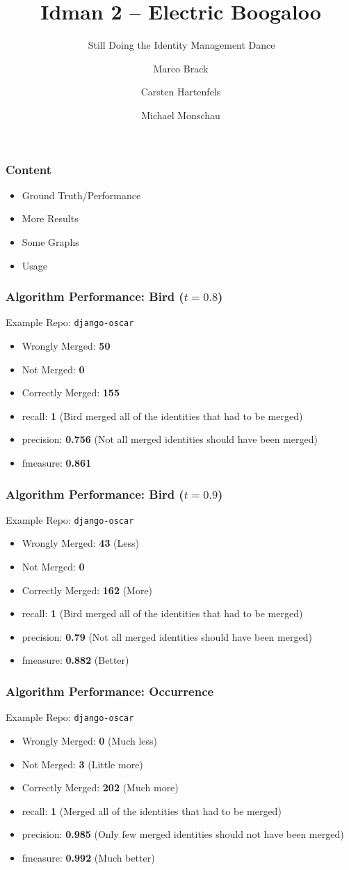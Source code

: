\documentclass[slidestop,usenames,dvipsnames]{beamer}
\title{Idman 2 -- Electric Boogaloo}
\subtitle{💃💃💃\ Still Doing the Identity Management Dance 💃💃💃}
\author{Marco Brack \and Carsten Hartenfels \and Michael Monschau}
\newcommand{\gitem}{\vfill\item}
\begin{document}
\begin{frame}
    \titlepage
\end{frame}




\begin{frame}
    \frametitle{Content}
    \begin{itemize}
      \gitem Ground Truth/Performance
       \gitem More Results
       \gitem Some Graphs
       \gitem Usage
    \end{itemize}
    \vfill
\end{frame}


\begin{frame}
  \frametitle{Algorithm Performance: Bird ($t=0.8$)}
  Example Repo: \texttt{django-oscar}
  \begin{itemize}
    \gitem Wrongly Merged: \textbf{50}
    \gitem Not Merged: \textbf{0}
    \gitem Correctly Merged: \textbf{155}
  \end{itemize}
  \begin{itemize}
    \gitem recall: \textbf{1} (Bird merged all of the identities that had to be merged)
    \gitem precision: \textbf{0.756} (Not all merged identities should have been merged)
    \gitem fmeasure: \textbf{0.861}
  \end{itemize}
  \vfill
\end{frame}


\begin{frame}
  \frametitle{Algorithm Performance: Bird ($t=0.9$)}
  Example Repo: \texttt{django-oscar}
  \begin{itemize}
    \gitem Wrongly Merged: \textbf{43} (Less)
    \gitem Not Merged: \textbf{0}
    \gitem Correctly Merged: \textbf{162} (More)
  \end{itemize}
  \begin{itemize}
    \gitem recall: \textbf{1} (Bird merged all of the identities that had to be merged)
    \gitem precision: \textbf{0.79} (Not all merged identities should have been merged)
    \gitem fmeasure: \textbf{0.882} (Better)
  \end{itemize}
  \vfill
\end{frame}


\begin{frame}
  \frametitle{Algorithm Performance: Occurrence}
  Example Repo: \texttt{django-oscar}
  \begin{itemize}
    \gitem Wrongly Merged: \textbf{0} (Much less)
    \gitem Not Merged: \textbf{3} (Little more)
    \gitem Correctly Merged: \textbf{202} (Much more)
  \end{itemize}
  \begin{itemize}
    \gitem recall: \textbf{1} (Merged all of the identities that had to be merged)
    \gitem precision: \textbf{0.985} (Only few merged identities should not have been merged)
    \gitem fmeasure: \textbf{0.992} (Much better)
  \end{itemize}
  \vfill
\end{frame}
\end{document}
